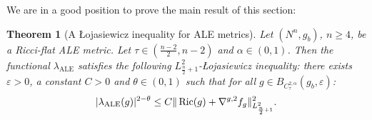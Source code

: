 \documentclass[a4paper,11pt,reqno]{amsart}
\newtheorem{theo}[defn]{Theorem}
\def\Ric{\mathop{\rm Ric}\nolimits}
\def\Ric{\mathop{\rm Ric}\nolimits}
\numberwithin{equation}{section}
\begin{document}
	
	
	We are in a good position to prove the main result of this section:
	\begin{theo}[A \L{}ojasiewicz inequality for ALE metrics]\label{theo-loja-ALE}
		Let $(N^n,g_b)$, $n\geqslant 4$, be a Ricci-flat ALE metric. Let $\tau\in \left(\frac{n-2}{2},n-2\right)$ and $\alpha\in(0,1)$. Then the functional $\lambda_{\operatorname{ALE}}$ satisfies the following $L^2_{\frac{n}{2}+1}$-\L{}ojasiewicz inequality: there exists $\varepsilon>0$, a constant $C>0$ and $\theta\in(0,1)$ such that for all $g\in B_{C^{2,\alpha}_{\tau}}(g_b,\varepsilon)$:
		\begin{equation}
		   |\lambda_{\operatorname{ALE}}(g)|^{2-\theta}\leq C\|\Ric(g) + \nabla^{g,2}{f_g}\|^2_{L^2_{\frac{n}{2}+1}}. \label{Lojasiewicz lambda ALE l2n/2+1}
		\end{equation} 
		
	\end{theo}
\end{document}

